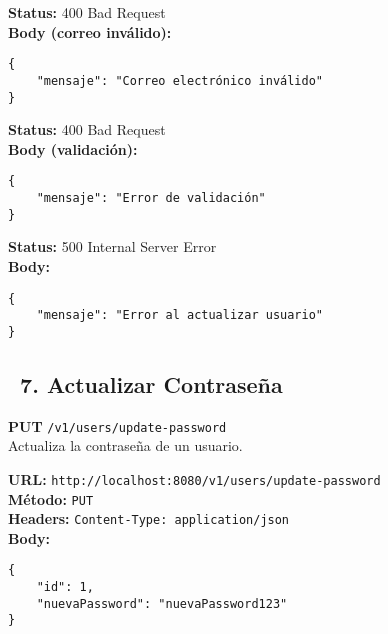 \begin{tcolorbox}[response]
    \textbf{Status:} 400 Bad Request\\
    \textbf{Body (correo inválido):}
    \begin{verbatim}
{
    "mensaje": "Correo electrónico inválido"
}
    \end{verbatim}
\end{tcolorbox}

\begin{tcolorbox}[response]
    \textbf{Status:} 400 Bad Request\\
    \textbf{Body (validación):}
    \begin{verbatim}
{
    "mensaje": "Error de validación"
}
    \end{verbatim}
\end{tcolorbox}

\begin{tcolorbox}[response]
    \textbf{Status:} 500 Internal Server Error\\
    \textbf{Body:}
    \begin{verbatim}
{
    "mensaje": "Error al actualizar usuario"
}
    \end{verbatim}
\end{tcolorbox}

\subsection*{\faServer\ 7. Actualizar Contraseña}
\begin{tcolorbox}[endpoint]
    \textbf{PUT} \texttt{/v1/users/update-password}\\
    Actualiza la contraseña de un usuario.
\end{tcolorbox}

\begin{tcolorbox}[request]
    \textbf{URL:} \textcolor{urlColor}{\texttt{http://localhost:8080/v1/users/update-password}}\\
    \textbf{Método:} \textcolor{methodColor}{\texttt{PUT}}\\
    \textbf{Headers:} \textcolor{headerColor}{\texttt{Content-Type: application/json}}\\
    \textbf{Body:}
    \begin{verbatim}
{
    "id": 1,
    "nuevaPassword": "nuevaPassword123"
}
    \end{verbatim}
\end{tcolorbox}

